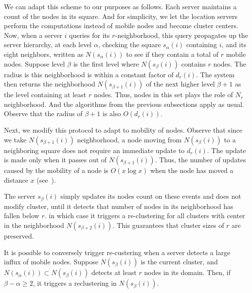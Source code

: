  We can adapt this scheme to our purposes as follows. Each server maintains a count of the nodes in its square. And for simplicity, we let the location servers perform the computations instead of mobile nodes and become cluster centers. Now, when a server $i$ queries for its $r$-neighborhood, this query propagates up the server hierarchy, at each level $\alpha$, checking the square $s_{\alpha}(i)$ containing $i$, and its eight neighbors, written as $N(s_{\alpha}(i))$ to see if they contain a total of $r$ mobile nodes. Suppose level $\beta$ is the first level where $N(s_{\beta}(i))$ contains $r$ nodes. The radius is this neighborhood is within a constant factor of $d_{r}(i)$. The system then returns the neighborhood $N(s_{\beta+1}(i))$ of the next higher level $\beta+1$ as the level containing at least $r$ nodes. Thus, nodes in this set plays the role of $N_{r}$ neighborhood. And the algorithms from the previous subsections apply as usual. Observe that the radius of $\beta+1$ is also $O(d_{r}(i))$. 

Next, we modify this protocol to adapt to mobility of nodes. Observe that since we take $N(s_{\beta+1}(i))$ neighborhood, a node moving from $N(s_{\beta}(i))$ to a neighboring square does not require an immediate update to $d_{r}(i)$. The update is made only when it passes out of $N(s_{\beta+1}(i))$. Thus, the number of updates caused by the mobility of a node is $O(x\log x)$ when the node has moved a distance $x$ (see~\cite{abraham04LLS}). 

The server $s_{\beta}(i)$ simply updates its nodes count on these events and does not modify cluster, until it detects that number of nodes in its neighborhood has fallen below $r$. in which case it triggers a re-clustering for all clusters with center in the neighborhood $N(s_{\beta+2}(i))$. This guarantees that cluster sizes of $r$ are preserved.

It is possible to conversely trigger re-custering when a server detects a large influx of mobile nodes. Suppose $N(s_{\beta}(i))$ is the current cluster, and  $N(s_{\alpha}(i))\subset N(s_{\beta}(i))$ detects at least $r$ nodes in its domain. Then, if $\beta-\alpha\geq 2$, it triggers a reclustering in $N(s_{\beta}(i))$.

